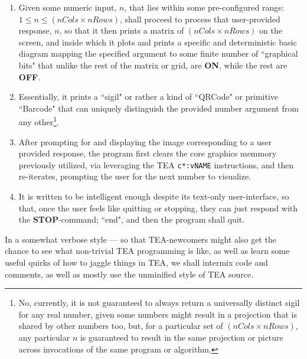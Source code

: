 \documentclass[a4paper, 18pt]{book} %
\begin{document}
\begin{enumerate}
\item Given some numeric input, $n$, that lies within some pre-configured range: $1 \leq n \leq (nCols \times nRows)$, shall proceed to process that user-provided response, $n$, so that it then prints a matrix of $(nCols \times nRows)$ on the screen, and inside which it plots and prints a specific and deterministic basic diagram mapping the specified argument to some finite number of ``graphical bits" that unlike the rest of the matrix or grid, are \textbf{ON}, while the rest are \textbf{OFF}.
\item Essentially, it prints a ``sigil" or rather a kind of ``QRCode" or primitive ``Barcode" that can uniquely distinguish the provided number argument from any other\footnote{No, currently, it is not guaranteed to always return a universally distinct sigil for any real number, given some  numbers might result in a projection that is shared by other numbers too, but, for a particular set of $(nCols \times nRows)$, any particular $n$ is guaranteed to result in the same projection or picture across invocations of the same program or algorithm.}.
\item After prompting for and displaying the image corresponding to a user provided response, the program first clears the core graphics memmory previously utilized, via leveraging the TEA \texttt{c*:vNAME} instructions, and then re-iterates, prompting the user for the next number to visualize.
\item It is written to be intelligent enough despite its text-only user-interface, so that, once the user feels like quitting or stopping, they can just respond with the \textbf{STOP}-command; ``end", and then the program shall quit.
\end{enumerate}

In a somewhat verbose style --- so that TEA-newcomers might also get the chance to see what non-trivial TEA programming is like, as well as learn some useful quirks of how to jaggle things in TEA, we shall intermix code and comments, as well as mostly use the unminified style of TEA source.
\end{document}
